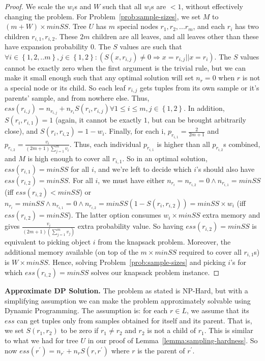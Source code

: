 \documentclass[10pt,journal,compsoc]{IEEEtran}
\newcounter{prob}
\newcommand{\stitle}[1]{\vspace{0.5em}\noindent\textbf{#1}}
\begin{document}
{\begin{proof}
We scale the $w_i$s and $W$ such that all $w_i$s are $< 1$, without effectively changing the problem. For Problem~\ref{prob:sample-sizes}, we set $M$ to $(m + W) \times minSS$. Tree $U$ has $m$ special nodes $r_1, r_2, ... r_m$, and each $r_i$ has two children $r_{i,1}, r_{i,2}$. These $2m$ children are all leaves, and all leaves other than these have expansion probability $0$. 
The $S$ values are such that $\forall i \in \left\lbrace 1, 2, ..m\right\rbrace, j \in \left\lbrace 1, 2 \right\rbrace : (S(x, r_{i,j}) \neq 0 \Rightarrow x = r_{i,j} || x = r_i)$. The $S$ values cannot be exactly zero when the first argument is the trivial rule, but we can make it small enough such that any optimal solution will set $n_r = 0$ when $r$ is not a special node or its child. So each leaf $r_{i,j}$ gets tuples from its own sample or it's parents' sample, and from nowhere else. Thus, $ess(r_{i,j}) = n_{r_{i,j}} + n_{r_i}S(r_i, r_{i,j}) \forall 1 \leq i \leq m, j \in \left\lbrace 1,2 \right\rbrace$. In addition, $S(r_i, r_{i,1}) = 1$ (again, it cannot be exactly $1$, but can be brought arbitrarily close), and $S(r_i, r_{i,2}) = 1 - w_i$. Finally, for each i, $p_{r_{i,1}} = \frac{2}{2m+1}$ and $p_{r_{i,2}} = \frac{v_i}{(2m+1)\sum_{j=1}^{m}v_i}$. Thus, each individual $p_{r_{i,1}}$ is higher than all $p_{r_{i,2}}$s combined, and $M$ is high enough to cover all $r_{i,1}$. So in an optimal solution, $ess(r_{i,1}) = minSS$ for all $i$, and we're left to decide which $i$'s should also have $ess(r_{i,2}) = minSS$. For all $i$, we must have either $n_{r_i} = n_{r_{i,2}} = 0 \land n_{r_{i,1}} = minSS$ (iff $ess(r_{i,2}) < minSS$) or $n_{r_i} = minSS \land n_{r_{i,1}} = 0 \land n_{r_{i,2}} = minSS (1 - S(r_i, r_{i,2})) = minSS \times w_i$ (iff $ess(r_{i,2}) = minSS$). The latter option consumes $w_i \times minSS$ extra memory and gives $\frac{v_i}{(2m+1)(\sum_{j=1}^{m}v_j)}$ extra probability value. So having $ess(r_{i,2}) = minSS$ is equivalent to picking object $i$ from the knapsack problem. Moreover, the additional memory available (on top of the $m \times minSS$ required to cover all $r_{i,1}$s) is $W\times minSS$. Hence, solving Problem~\ref{prob:sample-sizes} and picking $i$'s for which $ess(r_{i,2}) = minSS$ solves our knapsack problem instance. 
\end{proof}
}

\stitle{Approximate DP Solution.} The problem as stated is {\sc NP-Hard}, but with a simplifying assumption we can make the problem approximately solvable using  Dynamic Programming. The assumption is: for each $r \in L$, we assume that its $ess$ can get tuples only from samples obtained for itself and its parent. That is, we set $S(r_1, r_2)$ to be zero if $r_1 \neq r_2$ and $r_2$ is not a child of $r_1$. This is similar to what we had for tree $U$ in our proof of Lemma~\ref{lemma:sampling-hardness}. So now $ess(r^{\prime}) = n_{r^{\prime}} + n_rS(r, r^{\prime})$ where $r$ is the parent of $r^{\prime}$.
\end{document}
